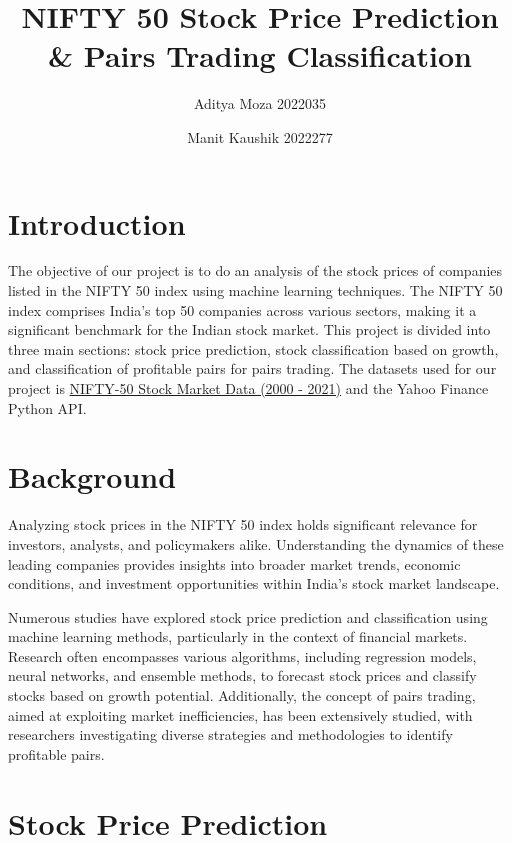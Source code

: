 \documentclass{article}
\begin{document}
\title{NIFTY 50 Stock Price Prediction \& Pairs Trading Classification}
\author{Aditya Moza 2022035 \and Manit Kaushik 2022277}
\date{} %

\maketitle

\section{Introduction}

The objective of our project is to do an analysis of the stock prices of companies listed in the NIFTY 50 index using machine learning techniques. The NIFTY 50 index comprises India's top 50 companies across various sectors, making it a significant benchmark for the Indian stock market. This project is divided into three main sections: stock price prediction, stock classification based on growth, and classification of profitable pairs for pairs trading. The datasets used for our project is \href{https://www.kaggle.com/datasets/rohanrao/nifty50-stock-market-data/data}{NIFTY-50 Stock Market Data (2000 - 2021)} and the Yahoo Finance Python API. 

\section{Background}
Analyzing stock prices in the NIFTY 50 index holds significant relevance for investors, analysts, and policymakers alike. Understanding the dynamics of these leading companies provides insights into broader market trends, economic conditions, and investment opportunities within India's stock market landscape.

Numerous studies have explored stock price prediction and classification using machine learning methods, particularly in the context of financial markets. Research often encompasses various algorithms, including regression models, neural networks, and ensemble methods, to forecast stock prices and classify stocks based on growth potential. Additionally, the concept of pairs trading, aimed at exploiting market inefficiencies, has been extensively studied, with researchers investigating diverse strategies and methodologies to identify profitable pairs.


\section{Stock Price Prediction}
\end{document}
